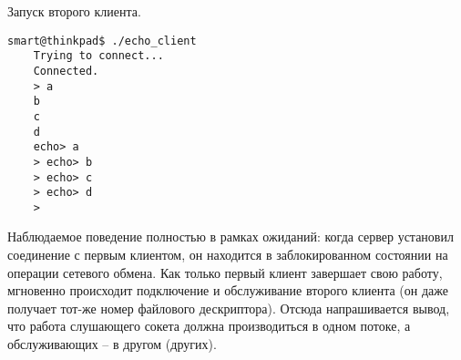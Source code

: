 Запуск второго клиента.
\begin{Verbatim}[frame=single]
    smart@thinkpad$ ./echo_client 
    Trying to connect...
    Connected.
    > a
    b
    c
    d
    echo> a
    > echo> b
    > echo> c
    > echo> d
    > 
\end{Verbatim}

Наблюдаемое поведение полностью в рамках ожиданий: когда сервер установил соединение с первым клиентом, он находится в заблокированном состоянии на операции сетевого обмена. Как только первый клиент завершает свою работу, мгновенно происходит подключение и обслуживание второго клиента (он даже получает тот-же номер файлового дескриптора). Отсюда напрашивается вывод, что работа слушающего сокета должна производиться в одном потоке, а обслуживающих -- в другом (других).